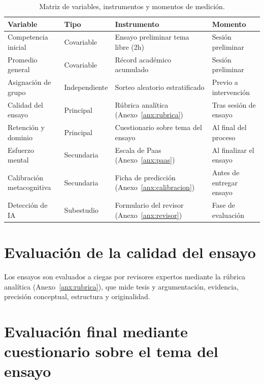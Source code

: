 \documentclass[12pt,a4paper,openany]{report}
\begin{document}
    \begin{table}[htbp]
        \centering
        \caption{Matriz de variables, instrumentos y momentos de medici\'on.}
        \label{tab:variables}
        \footnotesize
        \begin{tabular}{L{3.6cm} L{2.0cm} L{4.3cm} L{3.4cm}}
            \toprule
            \textbf{Variable} & \textbf{Tipo} & \textbf{Instrumento} & \textbf{Momento} \\
            \midrule
            Competencia inicial & Covariable & Ensayo preliminar tema libre (2h) & Sesi\'on preliminar \\
            Promedio general & Covariable & R\'ecord acad\'emico acumulado & Sesi\'on preliminar \\
            Asignaci\'on de grupo & Independiente & Sorteo aleatorio estratificado & Previo a intervenci\'on \\
            Calidad del ensayo & Principal & R\'ubrica anal\'itica (Anexo~\ref{anx:rubrica}) & Tras sesi\'on de ensayo \\
            Retenci\'on y dominio & Principal & Cuestionario sobre tema del ensayo & Al final del proceso \\
            Esfuerzo mental & Secundaria & Escala de Paas (Anexo~\ref{anx:paas}) & Al finalizar el ensayo \\
            Calibraci\'on metacognitiva & Secundaria & Ficha de predicci\'on (Anexo~\ref{anx:calibracion}) & Antes de entregar ensayo \\
            Detecci\'on de IA & Subestudio & Formulario del revisor (Anexo~\ref{anx:revisor}) & Fase de evaluaci\'on \\
            \bottomrule
        \end{tabular}
    \end{table}
    
    \section{Evaluaci\'on de la calidad del ensayo}
    
    Los ensayos son evaluados a ciegas por revisores expertos mediante la r\'ubrica anal\'itica (Anexo~\ref{anx:rubrica}), que mide tesis y argumentaci\'on, evidencia, precisi\'on conceptual, estructura y originalidad.
    
    \section{Evaluaci\'on final mediante cuestionario sobre el tema del ensayo}
    
\end{document}
